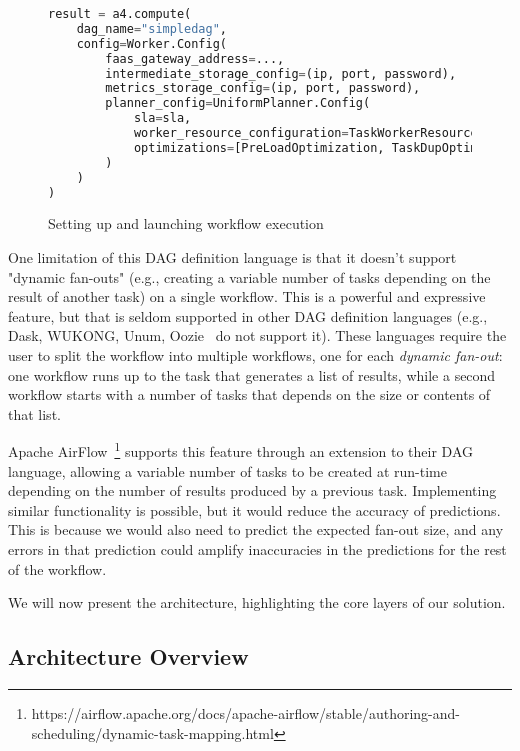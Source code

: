 \documentclass[conference]{IEEEtran}
\begin{document}
\begin{figure}[h]
\centering
\begin{lstlisting}[language=Python, basicstyle=\ttfamily\footnotesize, columns=fullflexible, breaklines=true]
result = a4.compute(
    dag_name="simpledag", 
    config=Worker.Config(
        faas_gateway_address=...,
        intermediate_storage_config=(ip, port, password),
        metrics_storage_config=(ip, port, password),
        planner_config=UniformPlanner.Config(
            sla=sla,
            worker_resource_configuration=TaskWorkerResourceConfiguration(cpus=3, memory_mb=512),
            optimizations=[PreLoadOptimization, TaskDupOptimization]
        )
    )
)
\end{lstlisting}
\caption{Setting up and launching workflow execution}
\label{lst:setup_and_launch_workflow_execution}
\end{figure}

One limitation of this DAG definition language is that it doesn't support "dynamic fan-outs" (e.g., creating a variable number of tasks depending on the result of another task) on a single workflow. This is a powerful and expressive feature, but that is seldom supported in other DAG definition languages (e.g., Dask, WUKONG, Unum, Oozie~\cite{apache_oozie} do not support it). These languages require the user to split the workflow into multiple workflows, one for each \textit{dynamic fan-out}: one workflow runs up to the task that generates a list of results, while a second workflow starts with a number of tasks that depends on the size or contents of that list. 

Apache AirFlow~\footnote{https://airflow.apache.org/docs/apache-airflow/stable/authoring-and-scheduling/dynamic-task-mapping.html} supports this feature through an extension to their DAG language, allowing a variable number of tasks to be created at run-time depending on the number of results produced by a previous task. Implementing similar functionality is possible, but it would reduce the accuracy of predictions. This is because we would also need to predict the expected fan-out size, and any errors in that prediction could amplify inaccuracies in the predictions for the rest of the workflow.

We will now present the architecture, highlighting the core layers of our solution.

\subsection{Architecture Overview}
\end{document}

